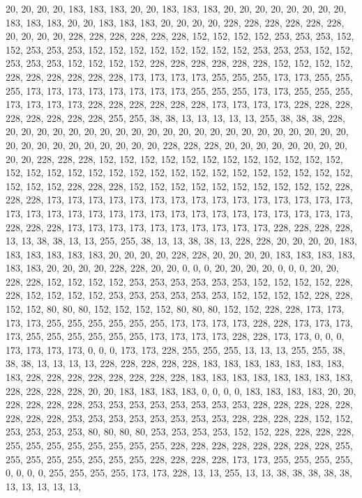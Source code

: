 {	20,  20,  20,  20,  183, 183, 183, 20,  20,  183, 183, 183, 20,  20,  20,  20,  20,  20,  20,  20,  183, 183, 183, 20,  20,  183, 183, 183, 20,  20,  20,  20,  228, 228, 228, 228, 228, 228, 20,  20,  20,  20,  228, 228, 228, 228, 228, 228, 152, 152, 152, 152, 253, 253, 253, 152, 152, 253, 253, 253, 152, 152, 152, 152, 152, 152, 152, 152, 253, 253, 253, 152, 152, 253, 253, 253, 152, 152, 152, 152, 228, 228, 228, 228, 228, 228, 152, 152, 152, 152, 228, 228, 228, 228, 228, 228, 173, 173, 173, 173, 255, 255, 255, 173, 173, 255, 255, 255, 173, 173, 173, 173, 173, 173, 173, 173, 255, 255, 255, 173, 173, 255, 255, 255, 173, 173, 173, 173, 228, 228, 228, 228, 228, 228, 173, 173, 173, 173, 228, 228, 228, 228, 228, 228, 228, 228, 255, 255, 38,  38,  13,  13,  13,  13,  13,  255, 38,  38,  38,  228, 
	20,  20,  20,  20,  20,  20,  20,  20,  20,  20,  20,  20,  20,  20,  20,  20,  20,  20,  20,  20,  20,  20,  20,  20,  20,  20,  20,  20,  20,  20,  20,  20,  228, 228, 228, 20,  20,  20,  20,  20,  20,  20,  20,  20,  20,  228, 228, 228, 152, 152, 152, 152, 152, 152, 152, 152, 152, 152, 152, 152, 152, 152, 152, 152, 152, 152, 152, 152, 152, 152, 152, 152, 152, 152, 152, 152, 152, 152, 152, 152, 228, 228, 228, 152, 152, 152, 152, 152, 152, 152, 152, 152, 152, 228, 228, 228, 173, 173, 173, 173, 173, 173, 173, 173, 173, 173, 173, 173, 173, 173, 173, 173, 173, 173, 173, 173, 173, 173, 173, 173, 173, 173, 173, 173, 173, 173, 173, 173, 228, 228, 228, 173, 173, 173, 173, 173, 173, 173, 173, 173, 173, 228, 228, 228, 228, 13,  13,  38,  38,  13,  13,  255, 255, 38,  13,  13,  38,  38,  13,  228, 
	228, 20,  20,  20,  20,  183, 183, 183, 183, 183, 183, 20,  20,  20,  20,  228, 228, 20,  20,  20,  20,  183, 183, 183, 183, 183, 183, 20,  20,  20,  20,  228, 228, 20,  20,  0,   0,   0,   20,  20,  20,  20,  0,   0,   0,   20,  20,  228, 228, 152, 152, 152, 152, 253, 253, 253, 253, 253, 253, 152, 152, 152, 152, 228, 228, 152, 152, 152, 152, 253, 253, 253, 253, 253, 253, 152, 152, 152, 152, 228, 228, 152, 152, 80,  80,  80,  152, 152, 152, 152, 80,  80,  80,  152, 152, 228, 228, 173, 173, 173, 173, 255, 255, 255, 255, 255, 255, 173, 173, 173, 173, 228, 228, 173, 173, 173, 173, 255, 255, 255, 255, 255, 255, 173, 173, 173, 173, 228, 228, 173, 173, 0,   0,   0,   173, 173, 173, 173, 0,   0,   0,   173, 173, 228, 255, 255, 255, 13,  13,  13,  255, 255, 38,  38,  38,  13,  13,  13,  13,  228, 
	228, 228, 228, 228, 183, 183, 183, 183, 183, 183, 183, 183, 228, 228, 228, 228, 228, 228, 228, 228, 183, 183, 183, 183, 183, 183, 183, 183, 228, 228, 228, 228, 20,  20,  183, 183, 183, 183, 0,   0,   0,   0,   183, 183, 183, 183, 20,  20,  228, 228, 228, 228, 253, 253, 253, 253, 253, 253, 253, 253, 228, 228, 228, 228, 228, 228, 228, 228, 253, 253, 253, 253, 253, 253, 253, 253, 228, 228, 228, 228, 152, 152, 253, 253, 253, 253, 80,  80,  80,  80,  253, 253, 253, 253, 152, 152, 228, 228, 228, 228, 255, 255, 255, 255, 255, 255, 255, 255, 228, 228, 228, 228, 228, 228, 228, 228, 255, 255, 255, 255, 255, 255, 255, 255, 228, 228, 228, 228, 173, 173, 255, 255, 255, 255, 0,   0,   0,   0,   255, 255, 255, 255, 173, 173, 228, 13,  13,  255, 13,  13,  38,  38,  38,  38,  38,  13,  13,  13,  13,  13,  
}
